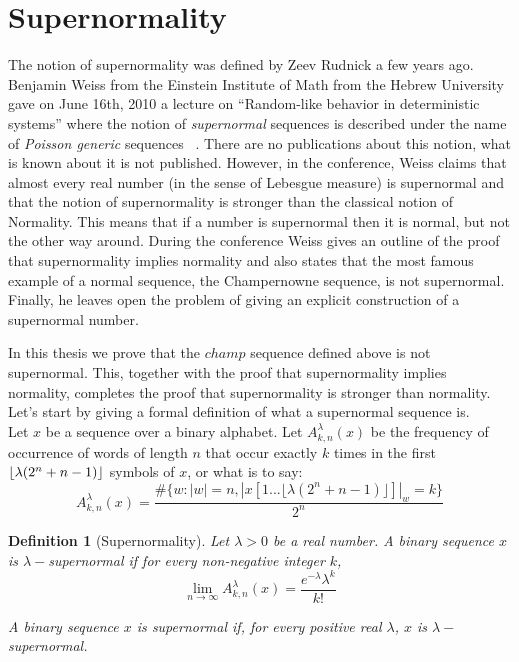 \documentclass[11pt,a4paper]{tesis}
\newtheorem{definition}{Definition}[]
\DeclarePairedDelimiter{\floor}{\lfloor}{\rfloor}
\begin{document}
\section{Supernormality}


The notion of supernormality was defined by Zeev Rudnick a few years ago. Benjamin Weiss from the Einstein Institute of Math from the Hebrew University gave on June 16th, 2010 a lecture on “Random-like behavior in deterministic systems”  where the notion of \textit{supernormal} sequences is described under the name of \textit{Poisson generic} sequences ~\cite{Weiss}.
There are no publications about this notion, what is known about it is  not published. 
However, in the conference, Weiss claims that almost every real number (in the sense of Lebesgue measure)
 is supernormal and that the notion of supernormality is stronger than the classical notion of Normality. This means that if a number is supernormal then it is normal, but not the other way around. 
During the conference Weiss gives an outline of the proof that supernormality implies normality and also states that the most famous example of a normal sequence, the Champernowne sequence, is not supernormal.
Finally, he leaves open the problem of giving an explicit construction of a supernormal number.

In this thesis we prove that the $champ$ sequence defined above is not supernormal. 
This, together with the proof that supernormality implies normality, completes the proof that supernormality is stronger than normality.
Let's start by giving a formal definition of what a supernormal sequence is.
\\

Let $x$ be a sequence over a binary alphabet.
Let $A^\lambda_{k,n}(x)$ be the frequency of occurrence of words of length $n$ that occur exactly $k$ times in the first $\floor{\lambda(2^n+n-1)}$ symbols of $x$, or what is to say:
$$A^\lambda_{k,n}(x) = \frac{\#\{w: |w| = n  , |x[1...\lfloor\lambda(2^n+n-1)\rfloor]|_w = k\}}{2^n}$$

\begin{definition}[Supernormality]
    Let $\lambda > 0$ be a real number. 
   A binary sequence $x$ is $\lambda-$supernormal if  for every non-negative integer $k$,
 $$\lim_{n\to\infty} A^\lambda_{k,n}(x) = \frac{e^{-\lambda}\lambda^k}{k!}$$
%

    A binary sequence $x$ is \textit{supernormal} if,  for every positive real $\lambda$, $x$ is $\lambda-$supernormal.
\end{definition}
\end{document}
